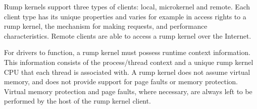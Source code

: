 Rump kernels support three types of clients: local, microkernel
and remote.  Each client type has its unique properties and varies for
example in access rights to a rump kernel, the mechanism for making
requests, and performance characteristics.  Remote clients are able to
access a rump kernel over the Internet.

For drivers to function, a rump kernel must possess runtime context
information.  This information consists of the process/thread
context and a unique rump kernel CPU that each thread is associated
with.  A rump kernel does not assume virtual memory, and does not
provide support for page faults or memory protection.  Virtual
memory protection and page faults, where necessary, are always
left to be performed by the host of the rump kernel client.
